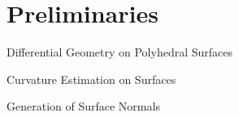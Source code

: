 \documentclass{stdlocal}
\begin{document}
\section{Preliminaries} %
\label{sub:preliminaries}

  Differential Geometry on Polyhedral Surfaces
  \autocite{polthier2006}

  Curvature Estimation on Surfaces
  \autocite{rusinkiewicz2004}

  Generation of Surface Normals
  \autocite{max1999,meyer2001,jin2005}

\end{document}
